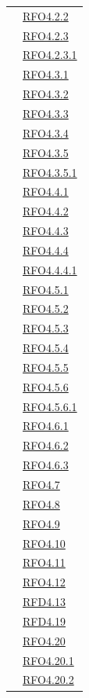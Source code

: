 \begin{longtable}{|>{\centering}m{5cm}|m{5cm}<{\centering}|}
& \hyperlink{RFO4.2.2}{RFO4.2.2}\\
& \hyperlink{RFO4.2.3}{RFO4.2.3}\\
& \hyperlink{RFO4.2.3.1}{RFO4.2.3.1}\\
& \hyperlink{RFO4.3.1}{RFO4.3.1}\\
& \hyperlink{RFO4.3.2}{RFO4.3.2}\\
& \hyperlink{RFO4.3.3}{RFO4.3.3}\\
& \hyperlink{RFO4.3.4}{RFO4.3.4}\\
& \hyperlink{RFO4.3.5}{RFO4.3.5}\\
& \hyperlink{RFO4.3.5.1}{RFO4.3.5.1}\\
& \hyperlink{RFO4.4.1}{RFO4.4.1}\\
& \hyperlink{RFO4.4.2}{RFO4.4.2}\\
& \hyperlink{RFO4.4.3}{RFO4.4.3}\\
& \hyperlink{RFO4.4.4}{RFO4.4.4}\\
& \hyperlink{RFO4.4.4.1}{RFO4.4.4.1}\\
& \hyperlink{RFO4.5.1}{RFO4.5.1}\\
& \hyperlink{RFO4.5.2}{RFO4.5.2}\\
& \hyperlink{RFO4.5.3}{RFO4.5.3}\\
& \hyperlink{RFO4.5.4}{RFO4.5.4}\\
& \hyperlink{RFO4.5.5}{RFO4.5.5}\\
& \hyperlink{RFO4.5.6}{RFO4.5.6}\\
& \hyperlink{RFO4.5.6.1}{RFO4.5.6.1}\\
& \hyperlink{RFO4.6.1}{RFO4.6.1}\\
& \hyperlink{RFO4.6.2}{RFO4.6.2}\\
& \hyperlink{RFO4.6.3}{RFO4.6.3}\\
& \hyperlink{RFO4.7}{RFO4.7}\\
& \hyperlink{RFO4.8}{RFO4.8}\\
& \hyperlink{RFO4.9}{RFO4.9}\\
& \hyperlink{RFO4.10}{RFO4.10}\\
& \hyperlink{RFO4.11}{RFO4.11}\\
& \hyperlink{RFO4.12}{RFO4.12}\\
& \hyperlink{RFD4.13}{RFD4.13}\\
& \hyperlink{RFD4.19}{RFD4.19}\\
& \hyperlink{RFO4.20}{RFO4.20}\\
& \hyperlink{RFO4.20.1}{RFO4.20.1}\\
& \hyperlink{RFO4.20.2}{RFO4.20.2}\\

\end{longtable}
